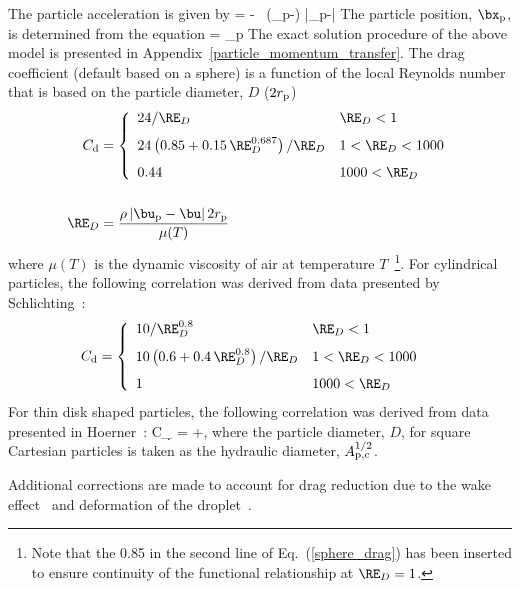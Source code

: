 The particle acceleration is given by
\be
     = \bg - \ha {} \,
    (\bu_{\rm p}-\bu) |\bu_{\rm p}-\bu|
    \label{part_accel}
\ee
The particle position, $\bx_{\rm p}$, is determined from the equation
\be
     = \bu_{\rm p}
\ee
The exact solution procedure of the above model is presented in Appendix~\ref{particle_momentum_transfer}. The drag coefficient (default based on a sphere) is a function of the local Reynolds number that is based on the particle diameter, $D$ ($2 r_{\rm p}$)
\begin{align}
 C_{\rm d} &= \left\{ \begin{array}{ll}
     24/\RE_D                                          & \RE_D < 1    \\[0.1in]
     24\left(0.85+0.15 \, \RE_D^{0.687} \right)/\RE_D  & 1 < \RE_D < 1000 \label{sphere_drag}\\[0.1in]
     0.44                                              & 1000 < \RE_D
     \end{array} \right.  \\[0.2in]
\RE_D &= \frac{\rho \, |\bu_{\rm p}-\bu| \, 2 r_{\rm p}}{\mu(T)} \end{align}
where $\mu(T)$ is the dynamic viscosity of air at temperature $T$~\cite{Crowe:1}\footnote{Note that the 0.85 in the second line of Eq.~(\ref{sphere_drag}) has been inserted to ensure continuity of the functional relationship at $\RE_D=1$.}. For cylindrical particles, the following correlation was derived from data presented by Schlichting~\cite{Schlichting:1}:
\begin{align}
 C_{\rm d} &= \left\{ \begin{array}{ll}
     10/\RE_D^{0.8}                                & \RE_D < 1    \\[0.1in]
     10\left(0.6+0.4 \, \RE_D^{0.8} \right)/\RE_D  & 1 < \RE_D < 1000 \\[0.1in]
     1                                             & 1000 < \RE_D
     \end{array} \right.
\end{align}
For thin disk shaped particles, the following correlation was derived from data presented in Hoerner~\cite{Hoerner:1965}:
\be
    C_{\d} = +,
\ee
where the particle diameter, $D$, for square Cartesian particles is taken as the hydraulic diameter, $A_{\rm p,c}^{1/2}$.

Additional corrections are made to account for drag reduction due to the wake effect~\cite{Ramirez:1} and deformation of the droplet~\cite{Loth:1}.



